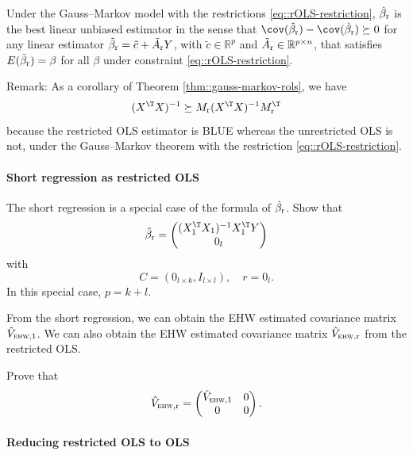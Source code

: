 \begin{theorem}
\label{thm::gauss-markov-rols}
Under the  Gauss--Markov model with the restrictions \eqref{eq::rOLS-restriction}, $\hat{\beta}_\textup{r} $ is the best linear unbiased estimator in the sense that $ \cov(\tilde{\beta}_\textup{r}) -  \cov( \hat{\beta}_\textup{r}  ) \succeq 0$ for any linear estimator $\tilde{\beta}_\textup{r} = \tilde{c} + \tilde{A}_\textup{r} Y$, with $\tilde{c} \in \mathbb{R}^p$ and $\tilde{A}_\textup{r} \in \mathbb{R}^{p\times n}$, that satisfies $E(\tilde{\beta}_\textup{r}) = \beta$ for all $\beta$ under constraint \eqref{eq::rOLS-restriction}. 
\end{theorem}

 

Remark: As a corollary of Theorem \ref{thm::gauss-markov-rols}, we have
$$
(X^{\T}X)^{-1} \succeq
M_\textup{r} (X^{\T}X)^{-1} M_\textup{r}^{\T} 
$$
because the restricted OLS estimator is BLUE whereas the unrestricted OLS is not, under the Gauss--Markov theorem with the restriction \eqref{eq::rOLS-restriction}. 


\paragraph{Short regression as restricted OLS}
\label{para::short-regression-rols}

The short regression is a  special case of the formula of $\hat{\beta}_\textup{r} $. Show that 
$$
\hat{\beta}_\textup{r}  = 
\begin{pmatrix}
(X_1^{\T} X_1)^{-1} X_1^{\T} Y  \\
0_l 
\end{pmatrix}
$$ 
with
$$
C  = (0_{l\times k}, I_{l\times l}),\quad r=0_l. 
$$
In this special case, $p=k+l$. 

From the short regression, we can obtain the EHW estimated covariance matrix $\hat{V}_{\textsc{ehw}, 1}$. We can also obtain the EHW estimated covariance matrix $\hat{V}_{\textsc{ehw}, \textup{r}} $ from the restricted OLS. 

Prove that
$$
\hat{V}_{\textsc{ehw}, \textup{r}}  = \begin{pmatrix}
\hat{V}_{\textsc{ehw}, 1} & 0 \\
0 & 0 
\end{pmatrix} .
$$




\paragraph{Reducing restricted OLS to OLS}\label{para::rols-to-ols}




